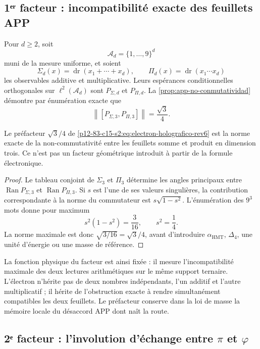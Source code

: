 \subsection{1ᵉʳ facteur : incompatibilité exacte des feuillets APP}

Pour \(d\geq2\), soit
\[
 \mathscr A_d=\{1,\ldots,9\}^d
\]
muni de la mesure uniforme, et soient
\[
 \Sigma_d(x)=\operatorname{dr}(x_1+\cdots+x_d),
 \qquad
 \Pi_d(x)=\operatorname{dr}(x_1\cdots x_d)
\]
les observables additive et multiplicative. Leurs espérances conditionnelles
orthogonales sur \(\ell^2(\mathscr A_d)\) sont
\(P_{\Sigma,d}\) et \(P_{\Pi,d}\). La
\cref{prop:app-no-conmutatividad} démontre par énumération exacte que
\[
 \left\|[P_{\Sigma,3},P_{\Pi,3}]\right\|
 =\frac{\sqrt3}{4}.
\]

\begin{proposition}
\label{p12-83-c15-s2:prop:prefactor-app-electron-rev6}
Le préfacteur \(\sqrt3/4\) de
\cref{p12-83-c15-s2:eq:electron-holografico-rev6} est la norme exacte de la
non-commutativité entre les feuillets somme et produit en dimension trois.
Ce n'est pas un facteur géométrique introduit à partir de la formule électronique.
\end{proposition}

\begin{proof}
Le tableau conjoint de \(\Sigma_3\) et \(\Pi_3\) détermine les angles
principaux entre
\(\operatorname{Ran}P_{\Sigma,3}\) et
\(\operatorname{Ran}P_{\Pi,3}\). Si \(s\) est l'une de ses valeurs
singulières, la contribution correspondante à la norme du commutateur est
\(s\sqrt{1-s^2}\). L'énumération des \(9^3\) mots donne pour maximum
\[
 s^2(1-s^2)=\frac3{16},
 \qquad s^2=\frac14.
\]
La norme maximale est donc \(\sqrt{3/16}=\sqrt3/4\), avant
d'introduire \(\alpha_{\mathrm{HMT}}\), \(\Delta_4\), une unité d'énergie
ou une masse de référence.
\end{proof}

La fonction physique du facteur est ainsi fixée : il mesure l'incompatibilité
maximale des deux lectures arithmétiques sur le même support ternaire.
L'électron n'hérite pas de deux nombres indépendants, l'un additif et l'autre
multiplicatif ; il hérite de l'obstruction exacte à rendre simultanément
compatibles les deux feuillets. Le préfacteur conserve dans la loi de masse la
mémoire locale du désaccord APP dont naît la route.

\subsection{2ᵉ facteur : l'involution d'échange entre \(\pi\) et \(\varphi\)}

